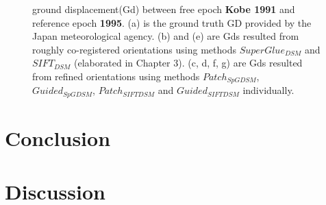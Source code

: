 \begin{figure}[htbp]
\begin{center}
		\caption{{\scriptsize ground displacement(Gd) between free epoch \textbf{Kobe 1991} and reference epoch \textbf{1995}. (a) is the ground truth GD provided by the Japan meteorological agency. (b) and (e) are Gds resulted from roughly co-registered orientations using methods $SuperGlue_{DSM}$ and $SIFT_{DSM}$ (elaborated in Chapter 3). (c, d, f, g) are Gds resulted from refined orientations using methods $Patch_{SpGDSM}$, $Guided_{SpGDSM}$, $Patch_{SIFTDSM}$ and $Guided_{SIFTDSM}$ individually.}}
		\label{GdKobe}
	\end{center}
\end{figure} 

\section{Conclusion}

\section{Discussion}
